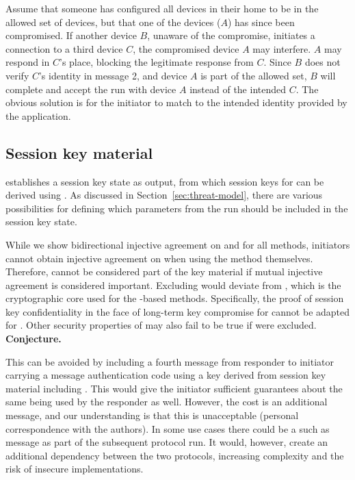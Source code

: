 \documentclass[runningheads, envcountsame, a4paper, draft, x11names]{llncs}
\newcommand{\spacehack}{\vspace{-1em}}
\newcommand{\fillhack}{\vspace{-0.5em}}
\begin{document}
Assume that someone has configured all devices in their home to be in the allowed set of devices, but that one of the devices ($A$) has since been compromised. If another device $B$, unaware of the compromise, initiates a connection to a third device $C$, the compromised device $A$ may interfere. $A$ may respond in $C$'s place, blocking the legitimate response from $C$. Since $B$ does not verify $C$'s identity in message 2, and device $A$ is part of the allowed set, $B$ will complete and accept the \mEdhoc{} run with device $A$ instead of the intended $C$. The obvious solution is for the initiator to match \mIdcredr{} to the intended identity provided by the application. 

\spacehack
\subsection{Session key material}
\label{sec:sessionKeyMaterial}
\fillhack
\mEdhoc{} establishes a session key state as output, from which session keys for \mOscore{} can be derived using \mHkdf{}. As discussed in Section~\ref{sec:threat-model}, there are various possibilities for defining which parameters from the \mEdhoc{} run should be included in the session key state.

While we show bidirectional injective agreement on \mGx{} and \mGy{}
for all methods, initiators cannot obtain injective agreement on \mGiy{} when using the \mStat{} method themselves. Therefore, \mGiy{} cannot be considered part of the key material if mutual injective agreement is considered important. Excluding \mGiy{} would deviate from \mOptls{}, which is the cryptographic core used for the \mStat-based methods. Specifically, the proof of session key confidentiality in the face of long-term key compromise for \mOptls{} cannot be adapted for \mEdhoc{}. Other security properties of \mOptls{} may also fail to be true if
\mGiy{} were excluded. \textbf{Conjecture.}
%

This can be avoided by including a fourth message from responder to initiator carrying a message authentication code using a key derived from session key material including \mGiy{}. This would give the initiator sufficient guarantees about the same \mGiy{} being used by the responder as well. However, the cost is an additional message, and our understanding is that this is unacceptable (personal correspondence with the \mSpec{} authors).
%
In some use cases there could be a such as message as part of
the subsequent \mOscore{} protocol run. It would, however, create an additional dependency between the two protocols, increasing complexity and the risk of insecure implementations.
\end{document}
